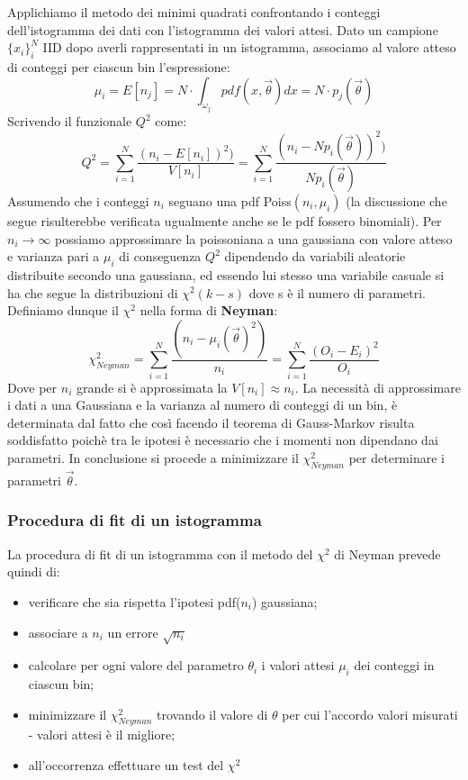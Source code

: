 Applichiamo il metodo dei minimi quadrati confrontando i conteggi dell'istogramma dei dati con l'istogramma dei valori attesi. Dato un campione $\{x_i\}_i^N$ IID dopo averli rappresentati in un istogramma, associamo al valore atteso di conteggi per ciascun bin l'espressione:
\begin{equation*}
	\mu_i = E[n_j] = N \cdot \int_{\omega_j}pdf(x, \vec{\theta})dx = N \cdot p_j(\vec{\theta}) 
\end{equation*}
Scrivendo il funzionale $Q^2$ come:
\begin{equation*}
Q^2 = \sum_{i=1}^N\dfrac{(n_i - E[n_i])^2)}{V[n_i]}	 = \sum_{i=1}^N\dfrac{(n_i - Np_i(\vec{\theta}))^2)}{Np_i(\vec{\theta})} 
\end{equation*}
Assumendo che i conteggi $n_i$ seguano una pdf Poiss$(n_i,\mu_i)$ (la discussione che segue risulterebbe verificata ugualmente anche se le pdf fossero binomiali). Per $n_i \rightarrow \infty$ possiamo approssimare la poissoniana a una gaussiana con valore atteso e varianza pari a $\mu_i$ di conseguenza $Q^2$ dipendendo da variabili aleatorie distribuite secondo una gaussiana, ed essendo lui stesso una variabile casuale si ha che segue la distribuzioni di $\chi^2(k-s)$ dove s \`{e} il numero di parametri. Definiamo dunque il $\chi^2$ nella forma di \textbf{Neyman}:
\begin{equation}
	\chi^2_{Neyman} = \sum_{i=1}^N\dfrac{(n_i - \mu_i(\vec{\theta})^2)}{n_i} = \sum_{i=1}^N\dfrac{(O_i - E_i)^2}{O_i}
\end{equation} 
Dove per $n_i$ grande si \`{e} approssimata la $V[n_i] \approx n_i$. La necessit\`{a} di approssimare i dati a una Gaussiana e la varianza al numero di conteggi di un bin, \`{e} determinata dal fatto che cos\`{i} facendo il teorema di Gauss-Markov risulta soddisfatto poich\`{e} tra le ipotesi \`{e} necessario che i momenti non dipendano dai parametri. In conclusione si procede a minimizzare il $\chi^2_{Neyman}$ per determinare i parametri $\vec{\theta}$.

\subsubsection{Procedura di fit di un istogramma}
La procedura di fit di un istogramma con il metodo del $\chi^2$ di Neyman prevede quindi di:

\begin{itemize}
	\item verificare che sia rispetta l'ipotesi pdf($n_i$) gaussiana;
	\item associare a $n_i$ un errore $\sqrt{n_i}$
	\item calcolare per ogni valore del parametro $\theta_i$ i valori attesi $\mu_i$ dei conteggi in ciascun bin;
	\item minimizzare il $\chi^2_{Neyman}$ trovando il valore di $\theta$ per cui l'accordo valori misurati - valori attesi \`{e} il migliore;
	\item all'occorrenza effettuare un test del $\chi^2$
	\end{itemize}
	
